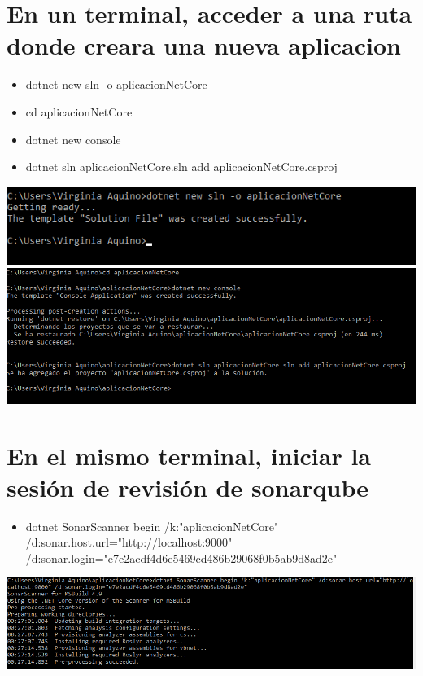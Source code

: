 \section{En un terminal, acceder a una ruta donde creara una nueva aplicacion } 
\begin{itemize}
    \item dotnet new sln -o aplicacionNetCore 
    \item cd aplicacionNetCore 
    \item dotnet new console
    \item dotnet sln aplicacionNetCore.sln add aplicacionNetCore.csproj 
\end{itemize}
\begin{center}
\includegraphics[width=\columnwidth]{images/11}\newline
\includegraphics[width=\columnwidth]{images/12}\newline

\end{center}
\section{ En el mismo terminal, iniciar la sesión de revisión de sonarqube } 
\begin{itemize}
    \item dotnet SonarScanner begin /k:"aplicacionNetCore" /d:sonar.host.url="http://localhost:9000" /d:sonar.login="e7e2acdf4d6e5469cd486b29068f0b5ab9d8ad2e"
\end{itemize}
\begin{center}
\includegraphics[width=\columnwidth]{images/13}\newline
\end{center}
